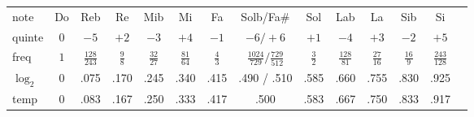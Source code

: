 \begin{figure}
    \begin{center}
        \begin{tabular}{l|ccccccccccccc}
            note   &   Do   &   Reb           &   Re     &    Mib        &   Mi          &    Fa    &  Solb/Fa\#                       &   Sol    &  Lab           &   La          &   Sib         &   Si            \\
            quinte &   $0$  &  $-5$           &  $+2$    &    $-3$       &  $+4$         &   $-1$   &  $-6/+6$                         &  $+1$    &  $-4$          &  $+3$         &  $-2$         &  $+5$           \\
            freq   &   $1$  &$\frac{128}{243}$&$\frac 98$&$\frac{32}{27}$&$\frac{81}{64}$&$\frac 43$&$\frac{1024}{729}/\frac{729}{512}$&$\frac 32$&$\frac{128}{81}$&$\frac{27}{16}$&$\frac{16}9$   &$\frac{243}{128}$\\
        $\log_2$   &\small 0&\small .075 &\small  .170& \small  .245& \small  .340 & \small  .415& \small  .490 / .510         &\small  .585&\small  .660&\small  .755  &\small  .830  &\small  .925    \\
              temp &\small 0&\small .083 &\small  .167& \small  .250& \small  .333 & \small  .417& \small  .500                &\small  .583&\small  .667&\small  .750  &\small  .833  &\small  .917    \\     
        \end{tabular}
    \end{center}
    \end{figure}
    
